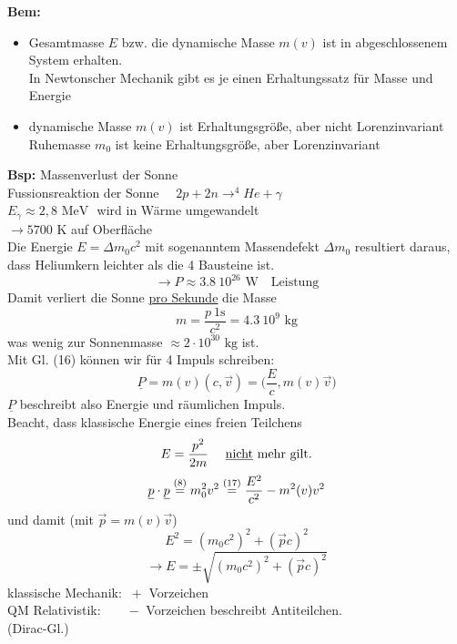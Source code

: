 \documentclass[titlepage,12pt,a4paper,ngerman]{report}
\newcommand{\tx}[1]{\textrm{#1}}
\begin{document}
\textbf{Bem:}\\
\begin{itemize}
	\item Gesamtmasse $ E $ bzw. die dynamische Masse $ m(v) $ ist in abgeschlossenem System erhalten.\\
	In Newtonscher Mechanik gibt es je einen Erhaltungssatz für Masse und Energie
	\item dynamische Masse $ m(v) $ ist Erhaltungsgröße, aber nicht Lorenzinvariant\\
	Ruhemasse $ m_0 $ ist keine Erhaltungsgröße, aber Lorenzinvariant
\end{itemize}
\textbf{Bsp:} Massenverlust der Sonne\\
Fussionsreaktion der Sonne $  \quad 2 p + 2 n \rightarrow ^4 He + \gamma $\\
$ E_{\gamma} \approx 2,8 \tx{ MeV } $ wird in Wärme umgewandelt \\
$ \rightarrow 5700 \tx{ K} $ auf Oberfläche\\
Die Energie $ E = \Delta m_0 c^2 $ mit sogenanntem Massendefekt $ \Delta m_0 $ resultiert daraus, dass Heliumkern leichter als die 4 Bausteine ist.
\begin{equation*}
\rightarrow P \approx 3.8 \ 10^{26} \tx{ W} \quad \tx{Leistung}
\end{equation*}
Damit verliert die Sonne \underline{pro Sekunde} die Masse
\begin{equation*}
m = \frac{p\  1 \tx{s}}{c^2} = 4.3 \ 10^9 \tx{ kg}
\end{equation*}
was wenig zur Sonnenmasse $ \approx 2 \cdot 10^{30} \tx{ kg} $ ist.\\[5pt]
Mit Gl. (16) können wir für 4 Impuls schreiben:
\begin{equation*}
\underline{P} = m (v) (c,\vec{v}) = \Big( \frac{E}{c} , m(v) \vec{v} \Big) \tag{17}
\end{equation*}
$ \underline{P} $ beschreibt also Energie und räumlichen Impuls.\\[5pt]
Beacht, dass klassische Energie eines freien Teilchens 
\begin{equation*}
E = \frac{p^2}{2m} \quad \tx{ \underline{nicht} mehr gilt.}
\end{equation*}
\begin{equation*}
\underline{p} \cdot \underline{p} \buildrel (8) \over = m_0^2 v^2 \buildrel (17) \over = \frac{E^2}{c^2} - m^2(v) v^2
\end{equation*}
und damit (mit $ \vec{p} = m(v) \vec{v} $)
\begin{equation*}
E^2 = (m_0 c^2)^2 + (\vec{p} c)^2 \tag{18}
\end{equation*}
\begin{equation*}
\rightarrow E = \pm \sqrt{(m_0c^2)^2 + (\vec{p} c)^2}
\end{equation*}
klassische Mechanik: $\ + $ Vorzeichen\\
QM Relativistik: $\quad \ \ \  - $ Vorzeichen beschreibt Antiteilchen.\\
(Dirac-Gl.)
\end{document}
